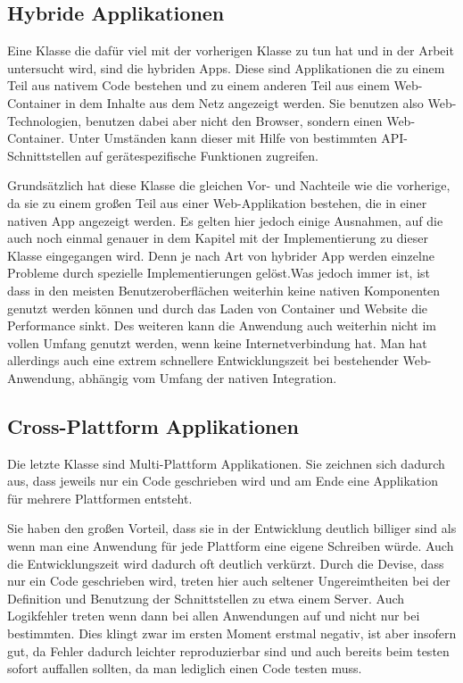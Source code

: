 \subsection{Hybride Applikationen}
Eine Klasse die dafür viel mit der vorherigen Klasse zu tun hat und in der Arbeit untersucht wird, sind die hybriden Apps. Diese sind Applikationen die zu einem Teil aus nativem Code bestehen und zu einem anderen Teil aus einem Web-Container in dem Inhalte aus dem Netz angezeigt werden. Sie benutzen also Web-Technologien, benutzen dabei aber nicht den Browser, sondern einen Web-Container. Unter Umständen kann dieser mit Hilfe von bestimmten API-Schnittstellen auf gerätespezifische Funktionen zugreifen.\cite{IEEE_development_classes}

Grundsätzlich hat diese Klasse die gleichen Vor- und Nachteile wie die vorherige, da sie zu einem großen Teil aus einer Web-Applikation bestehen, die in einer nativen App angezeigt werden. Es gelten hier jedoch einige Ausnahmen, auf die auch noch einmal genauer in dem Kapitel mit der Implementierung zu dieser Klasse eingegangen wird. Denn je nach Art von hybrider App werden einzelne Probleme durch spezielle Implementierungen gelöst.Was jedoch immer ist, ist dass in den meisten Benutzeroberflächen weiterhin keine nativen Komponenten genutzt werden können und durch das Laden von Container und Website die Performance sinkt.\cite{IEEE_development_classes} Des weiteren kann die Anwendung auch weiterhin nicht im vollen Umfang genutzt werden, wenn keine Internetverbindung hat. Man hat allerdings auch eine extrem schnellere Entwicklungszeit bei bestehender Web-Anwendung, abhängig vom Umfang der nativen Integration.

\subsection{Cross-Plattform Applikationen}
Die letzte Klasse sind Multi-Plattform Applikationen. Sie zeichnen sich dadurch aus, dass jeweils nur ein Code geschrieben wird und am Ende eine Applikation für mehrere Plattformen entsteht. 

Sie haben den großen Vorteil, dass sie in der Entwicklung deutlich billiger sind als wenn man eine Anwendung für jede Plattform eine eigene Schreiben würde. Auch die Entwicklungszeit wird dadurch oft deutlich verkürzt. Durch die Devise, dass nur ein Code geschrieben wird, treten hier auch seltener Ungereimtheiten bei der Definition und Benutzung der Schnittstellen zu etwa einem Server. Auch Logikfehler treten wenn dann bei allen Anwendungen auf und nicht nur bei bestimmten. Dies klingt zwar im ersten Moment erstmal negativ, ist aber insofern gut, da Fehler dadurch leichter reproduzierbar sind und auch bereits beim testen sofort auffallen sollten, da man lediglich einen Code testen muss.

